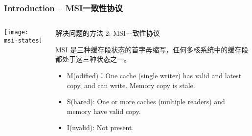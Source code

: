 \begin{frame}[plain]	
	\frametitle{Introduction -- MSI一致性协议}
	
	
	\begin{columns}
		
		\begin{column}{.4\textwidth}
			\texttt{[image: msi-states]}
		\end{column}
		\begin{column}{.6\textwidth}
			解决问题的方法 2: MSI一致性协议
			
			MSI 是三种缓存段状态的首字母缩写，任何多核系统中的缓存段都处于这三种状态之一。
			\begin{itemize}
				\item M(odified)：One cache (single writer) has valid and latest copy, and can write. Memory copy is stale.
				\item S(hared): One or more caches (multiple readers) and memory have valid copy.
				\item I(nvalid): Not present.
			\end{itemize}
			
		\end{column}
	\end{columns}
	
\end{frame}



